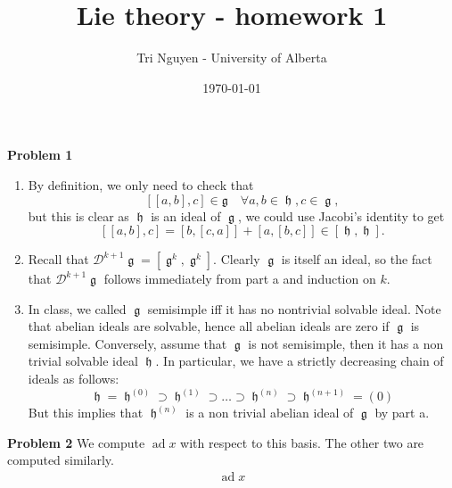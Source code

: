 \documentclass[12pt]{article} %
\title{Lie theory - homework 1} %
\author{Tri Nguyen - University of Alberta} %
\date{\today} %
\DeclareMathOperator{\frkh}{\mathfrak{h}}
\DeclareMathOperator{\frkg}{\mathfrak{g}}
\DeclareMathOperator{\ad}{ad}
\begin{document}
\maketitle
\textbf{Problem 1}
\begin{enumerate}
    \item By definition, we only need to check that
          \[[[a,b],c] \in \mathfrak{g} \quad \forall a,b \in \frkh, c \in \frkg,\]
          but this is clear as $\frkh$ is an ideal of $\frkg$, we could use Jacobi's identity to get
          \[[[a,b],c] = [b,[c,a]]+ [a,[b,c]] \in [\frkh,\frkh].\]
    \item Recall that $\mathcal{D}^{k+1} \frkg = [\frkg^k,\frkg^k]$. Clearly $\frkg$ is itself an ideal, so the fact that
          $\mathcal{D}^{k+1}\frkg$ follows immediately from part a and induction on $k$.
    \item In class, we called $\frkg$ semisimple iff it has no nontrivial solvable ideal. Note that abelian ideals are solvable, hence all abelian ideals are zero if $\frkg$ is semisimple.
          Conversely, assume that $\frkg$ is not semisimple, then it has a non trivial solvable ideal $\frkh$. In particular, we have a strictly decreasing chain of ideals as follows:
          \[\frkh = \frkh^{(0)} \supset \frkh^{(1)} \supset \ldots \supset \frkh^{(n)} \supset \frkh^{(n+1)}= (0)\]
          But this implies that $\frkh^{(n)}$ is a non trivial abelian ideal of $\frkg$ by part a.
\end{enumerate}
\textbf{Problem 2}
We compute $\ad x$ with respect to this basis. The other two are computed similarly.
\begin{align}
    \ad x
\end{align}
\end{document}
